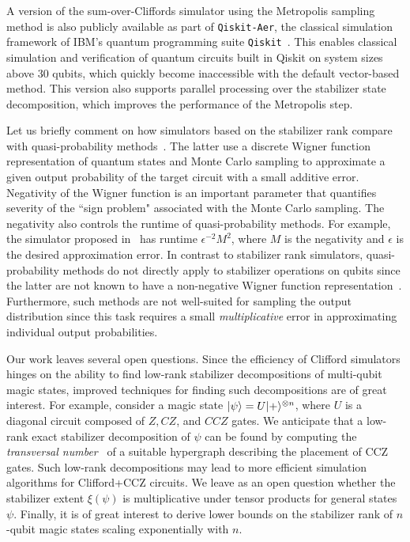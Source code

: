 A version of the sum-over-Cliffords simulator using the Metropolis sampling method is also publicly available
as part of \texttt{Qiskit-Aer}, the classical simulation framework of IBM's quantum
programming suite \texttt{Qiskit}~\cite{Qiskit}. This enables classical simulation and verification of quantum
circuits built in Qiskit on system sizes above $30$ qubits, which quickly become inaccessible with the
default vector-based method. This version also supports parallel processing over the stabilizer state decomposition,
which improves the performance of the Metropolis step.

Let us briefly comment on how simulators based on the stabilizer rank compare
with quasi-probability  methods~\cite{pashayan15,Delfosse15rebits,kocia2017discrete}.
The latter use a discrete Wigner function representation of quantum states
and Monte Carlo sampling
to approximate a given output probability of the target circuit with a small
additive error. Negativity of the Wigner function is an important parameter
that quantifies severity of the ``sign problem" associated with the Monte Carlo sampling.
The negativity also controls the runtime of quasi-probability methods. 
For example, the simulator proposed in~\cite{pashayan15}
has runtime $\epsilon^{-2} M^2$, where $M$ is the negativity and $\epsilon$
is the desired approximation error. In contrast to stabilizer rank simulators,
quasi-probability methods do not directly apply to stabilizer
operations on qubits since the latter are not known to have a non-negative Wigner function 
representation~\cite{Delfosse15rebits,karanjai2018contextuality}.
Furthermore, such methods are not well-suited for sampling the output
distribution since this task requires a small {\em multiplicative} error in 
approximating individual output probabilities. 

Our work leaves several  open questions. 
Since the efficiency of Clifford simulators hinges on the ability to find low-rank
stabilizer decompositions of multi-qubit magic states, 
improved techniques for finding such decompositions are of great interest. 
For example, consider a magic state $|\psi\rangle=U|+\rangle^{\otimes n}$, where 
$U$ is a diagonal circuit composed of $Z,CZ$, and $CCZ$ gates.
We anticipate that a low-rank exact stabilizer decomposition of $\psi$ can be 
found by computing the {\em transversal number}~\cite{alon1990transversal} of a suitable hypergraph describing
the placement of CCZ gates. Such low-rank decompositions may lead to more efficient
simulation algorithms for Clifford+CCZ circuits. We leave as an open question whether
the stabilizer extent $\xi(\psi)$ is multiplicative under tensor products for general states $\psi$.
Finally, it is of great interest to derive lower bounds on the stabilizer rank
of $n$-qubit magic states scaling exponentially with $n$. 





